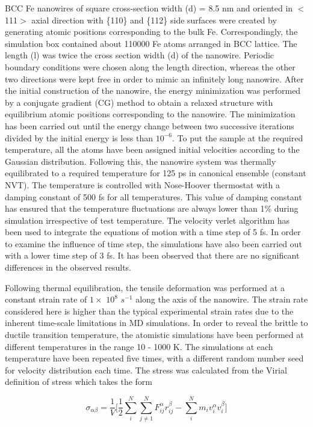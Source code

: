\documentclass[%
reprint,%
 amssymb, amsmath,%
 aip,apl,%
]{revtex4-1}
\begin{document}
BCC Fe nanowires of square cross-section width (d) = 8.5 nm and oriented in $<$111$>$ axial direction with \{110\} and \{112\} 
side surfaces were created by generating atomic positions corresponding to the bulk Fe. Correspondingly, the simulation box contained 
about 110000 Fe atoms arranged in BCC lattice. The length (l) was twice the cross section width (d) of the nanowire. Periodic boundary 
conditions were chosen along the length direction, whereas the other two directions were kept free in order to mimic an infinitely 
long nanowire. After the initial construction of the nanowire, the energy minimization was performed by a conjugate gradient (CG) 
method to obtain a relaxed structure with equilibrium atomic positions corresponding to the nanowire. The minimization has been 
carried out until the energy change between two successive iterations divided by the initial energy is less than $10^{-6}$. To put 
the sample at the required temperature, all the atoms have been assigned initial velocities according to the Gaussian distribution. 
Following this, the nanowire system was thermally equilibrated to a required temperature for 125 ps in canonical ensemble (constant 
NVT). The temperature is controlled with Nose-Hoover thermostat with a damping constant of 500 fs for all temperatures. This value 
of damping constant has ensured that the temperature fluctuations are always lower than 1\% during simulation irrespective of test 
temperature. The velocity verlet algorithm has been used to integrate the equations of motion with a time step of 5 fs. In order to 
examine the influence of time step, the simulations have also been carried out with a lower time step of 3 fs. It has been observed 
that there are no significant differences in the observed results.

Following thermal equilibration, the tensile deformation was performed at a constant strain rate of $1\times$ $10^8$ $s^{-1}$ along 
the axis of the nanowire. The strain rate considered here is higher than the typical experimental strain rates due to the inherent 
time-scale limitations in MD simulations. In order to reveal the brittle to ductile transition temperature, the atomistic simulations 
have been performed at different temperatures in the range 10 - 1000 K. The simulations at each temperature have been repeated five 
times, with a different random number seed for velocity distribution each time. The stress was calculated from the Virial definition 
of stress \cite{Virial-Yip,Virial-Zhou} which takes the form

$$ \sigma_{\alpha \beta} = \frac{1}{V} \Bigg[ \frac{1}{2} \sum_{i}^N \sum_{j\neq 1}^{N} F_{ij}^{\alpha} r_{ij}^{\beta} - 
\sum_{i}^N m_i v_i^\alpha v_i^\beta \Bigg] $$
\end{document}
